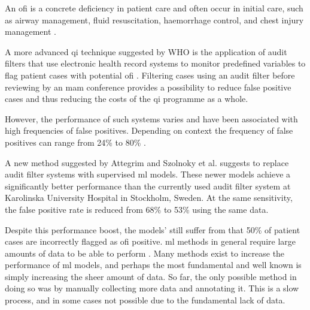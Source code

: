 \documentclass[12pt, letterpaper]{article}
\begin{document}
An \acrshort{ofi} is a concrete deficiency in patient care and often occur in initial care, such as airway management, fluid resuscitation, haemorrhage control, and chest injury management \cite{world_health_organization_guidelines_2009,roy_learning_2017,oreilly_opportunities_2013,sanddal_analysis_2011}.

A more advanced \acrshort{qi} technique suggested by WHO is the application of audit filters that use electronic health record systems to monitor predefined variables to flag patient cases with potential \acrfull{ofi} \cite{world_health_organization_guidelines_2009}. Filtering cases using an audit filter before reviewing by an \acrshort{mam} conference provides a possibility to reduce false positive cases and thus reducing the costs of the \acrshort{qi} programme as a whole.

However, the performance of such systems varies and have been associated with high frequencies of false positives. Depending on context the frequency of false positives can range from 24\% to 80\% \cite{attergrim_predicting_2023,sanddal_analysis_2011,roy_learning_2017,ghorbani_analysis_2018}.

A new method suggested by Attegrim and Szolnoky et al. \cite{attergrim_predicting_2023} suggests to replace audit filter systems with supervised \acrfull{ml} models. These newer models achieve a significantly better performance than the currently used audit filter system at Karolinska University Hospital in Stockholm, Sweden. At the same sensitivity, the false positive rate is reduced from 68\% to 53\% using the same data.

Despite this performance boost, the models' still suffer from that 50\% of patient cases are incorrectly flagged as \acrshort{ofi} positive. \acrshort{ml} methods in general require large amounts of data to be able to perform \cite{piccialli_survey_2021}. Many methods exist to increase the performance of \acrshort{ml} models, and perhaps the most fundamental and well known is simply increasing the sheer amount of data. So far, the only possible method in doing so was by manually collecting more data and annotating it. This is a slow process, and in some cases not possible due to the fundamental lack of data.
\end{document}

